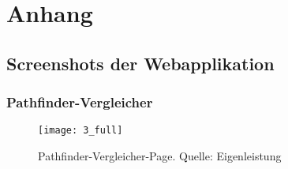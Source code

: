 \chapter{Anhang}
\section{Screenshots der Webapplikation}
\subsection{Pathfinder-Vergleicher}
\begin{figure}[H]
  \centering
  \texttt{[image: 3\_full]}
  \caption[Ein vollständiger Screenshot des Pathfinder-Vergleichers.]{Pathfinder-Vergleicher-Page. Quelle: Eigenleistung}
  \label{fig:comparator_screenshot}
\end{figure}
